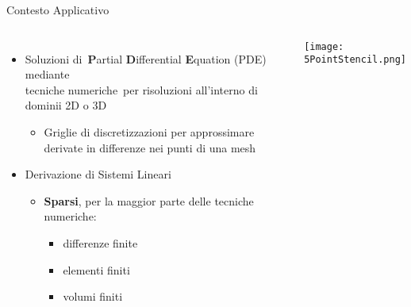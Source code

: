 \begin{frame} {Contesto Applicativo}%
\begin{columns}
	\begin{itemize}
		\item	Soluzioni di {\bf P}artial {\bf D}ifferential {\bf E}quation (PDE) mediante\\
		tecniche numeriche per risoluzioni all'interno di dominii 2D o 3D
		\begin{itemize}
			\item	Griglie di discretizzazioni per 
			approssimare derivate in differenze nei punti di una mesh
		\end{itemize}
		\pause
		\item	Derivazione di Sistemi Lineari
		\pause
		\begin{itemize}
			\item	{\bf Sparsi}, per la maggior parte delle tecniche numeriche:
			\begin{itemize}
				\item differenze finite
				\item	elementi finiti
				\item	volumi finiti
			\end{itemize}
		\end{itemize}
	\end{itemize}
	\texttt{[image: 5PointStencil.png]}
	
\end{columns}

\end{frame}

